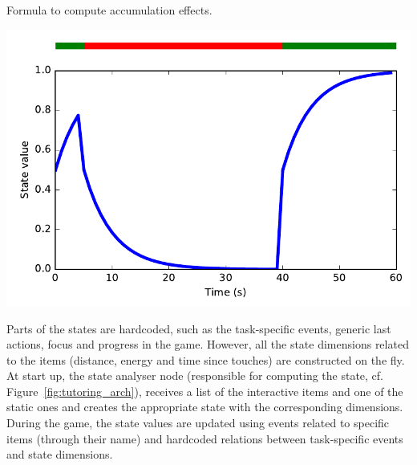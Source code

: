 \begin{minipage}[t]{0.53\textwidth}
\begin{algorithm}[H]
	\caption{Formula to compute accumulation effects.}
	\label{algo:tuto_acc}
\end{algorithm}
\end{minipage}
\begin{minipage}[t]{0.47\textwidth}
		\centering
		\vspace{.1cm}
		\includegraphics[width=1\textwidth]{accumulation.pdf}
		\label{fig:tuto_acc}
\end{minipage}

Parts of the states are hardcoded, such as the task-specific events, generic last actions, focus and progress in the game. However, all the state dimensions related to the items (distance, energy and time since touches) are constructed on the fly. At start up, the state analyser node (responsible for computing the state, cf. Figure~\ref{fig:tutoring_arch}), receives a list of the interactive items and one of the static ones and creates the appropriate state with the corresponding dimensions. During the game, the state values are updated using events related to specific items (through their name) and hardcoded relations between task-specific events and state dimensions. 

